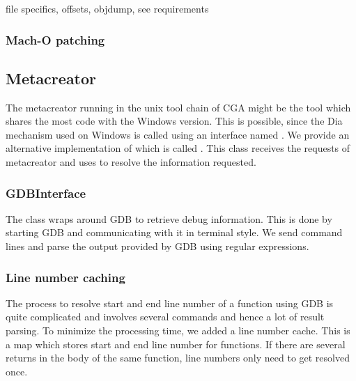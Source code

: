 file specifics, offsets, objdump, see requirements


\subsubsection{Mach-O patching}




\subsection{Metacreator} The metacreator running in the unix tool chain of CGA might be the tool which shares the most code with the Windows version. This is possible, since the Dia mechanism used on Windows is called using an interface named . We provide an alternative implementation of  which is called . This class receives the requests of metacreator and uses  to resolve the information requested.

\subsubsection{GDBInterface} The  class wraps around GDB to retrieve debug information. This is done by starting GDB and communicating with it in terminal style. We send command lines and parse the output provided by GDB using regular expressions. 

\subsubsection{Line number caching} The process to resolve start and end line number of a function using GDB is quite complicated and involves several commands and hence a lot of result parsing. To minimize the processing time, we added a line number cache. This is a map which stores start and end line number for functions. If there are several returns in the body of the same function, line numbers only need to get resolved once.
